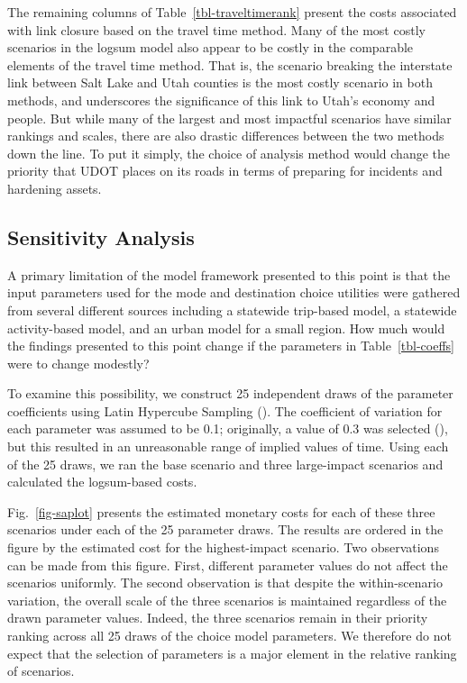 \documentclass[]{ascelike-new}
\begin{document}
The remaining columns of Table~\ref{tbl-traveltimerank} present the
costs associated with link closure based on the travel time method. Many
of the most costly scenarios in the logsum model also appear to be
costly in the comparable elements of the travel time method. That is,
the scenario breaking the interstate link between Salt Lake and Utah
counties is the most costly scenario in both methods, and underscores
the significance of this link to Utah's economy and people. But while
many of the largest and most impactful scenarios have similar rankings
and scales, there are also drastic differences between the two methods
down the line. To put it simply, the choice of analysis method would
change the priority that UDOT places on its roads in terms of preparing
for incidents and hardening assets.

\subsection{Sensitivity Analysis}\label{sensitivity-analysis}

A primary limitation of the model framework presented to this point is
that the input parameters used for the mode and destination choice
utilities were gathered from several different sources including a
statewide trip-based model, a statewide activity-based model, and an
urban model for a small region. How much would the findings presented to
this point change if the parameters in Table~\ref{tbl-coeffs} were to
change modestly?

To examine this possibility, we construct 25 independent draws of the
parameter coefficients using Latin Hypercube Sampling
(). The coefficient of
variation for each parameter was assumed to be 0.1; originally, a value
of 0.3 was selected (),
but this resulted in an unreasonable range of implied values of time.
Using each of the 25 draws, we ran the base scenario and three
large-impact scenarios and calculated the logsum-based costs.

Fig.~\ref{fig-saplot} presents the estimated monetary costs for each of
these three scenarios under each of the 25 parameter draws. The results
are ordered in the figure by the estimated cost for the highest-impact
scenario. Two observations can be made from this figure. First,
different parameter values do not affect the scenarios uniformly. The
second observation is that despite the within-scenario variation, the
overall scale of the three scenarios is maintained regardless of the
drawn parameter values. Indeed, the three scenarios remain in their
priority ranking across all 25 draws of the choice model parameters. We
therefore do not expect that the selection of parameters is a major
element in the relative ranking of scenarios.
\end{document}
